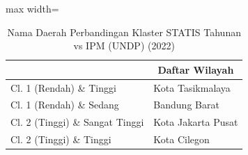 \begin{table}[H]
\centering
\caption{Nama Daerah Perbandingan Klaster STATIS Tahunan vs IPM (UNDP) (2022)} \label{tab:sample1statis_ipm_name_2022}
\begin{adjustbox}{max width=\textwidth}
\begin{tabular}{|>{\centering\arraybackslash}p{4cm}|p{10cm}|}
\hline
\multicolumn{1}{|c|}{\textbf{Kategori}} & \multicolumn{1}{c|}{\textbf{Daftar Wilayah}} \\
\hline
Cl. 1 (Rendah) \& Tinggi & Kota Tasikmalaya \\
\hline
Cl. 1 (Rendah) \& Sedang & Bandung Barat \\
\hline
Cl. 2 (Tinggi) \& Sangat Tinggi & Kota Jakarta Pusat \\
\hline
Cl. 2 (Tinggi) \& Tinggi & Kota Cilegon \\
\hline
\end{tabular}
\end{adjustbox}
\end{table}